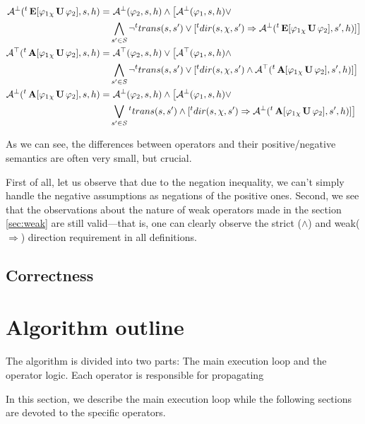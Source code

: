 \begin{align*}
	\mathcal{A}^\bot({}^{t}\operatorname{\mathbf{E}}[ \varphi_1 {}_{\chi}\operatorname{\mathbf{U}} \varphi_2], s, h) = &\ \mathcal{A}^\bot(\varphi_2, s, h) \land \big[ \mathcal{A}^\bot(\varphi_1, s, h) \lor \\
	& \bigwedge_{s' \in \mathit{S}} \neg{}^{t}trans(s,s') \lor [{}^{t}dir(s, \chi, s') \Rightarrow \mathcal{A}^\bot({}^{t}\operatorname{\mathbf{E}}[ \varphi_1 {}_{\chi}\operatorname{\mathbf{U}} \varphi_2], s', h)] \big] \\
	\mathcal{A}^\top({}^{t}\operatorname{\mathbf{A}}[ \varphi_1 {}_{\chi}\operatorname{\mathbf{U}} \varphi_2], s, h) = &\ \mathcal{A}^\top(\varphi_2, s, h) \lor \big[ \mathcal{A}^\top(\varphi_1, s, h) \land \\
	& \bigwedge_{s' \in \mathit{S}} \neg{}^{t}trans(s,s') \lor [{}^{t}dir(s, \chi, s') \land \mathcal{A}^\top({}^{t}\operatorname{\mathbf{A}}[ \varphi_1 {}_{\chi}\operatorname{\mathbf{U}} \varphi_2], s', h)] \big] \\
	\mathcal{A}^\bot({}^{t}\operatorname{\mathbf{A}}[ \varphi_1 {}_{\chi}\operatorname{\mathbf{U}} \varphi_2], s, h) = &\ \mathcal{A}^\bot(\varphi_2, s, h) \land \big[ \mathcal{A}^\bot(\varphi_1, s, h) \lor \\
	& \bigvee_{s' \in \mathit{S}} {}^{t}trans(s,s') \land [{}^{t}dir(s, \chi, s') \Rightarrow \mathcal{A}^\bot({}^{t}\operatorname{\mathbf{A}}[ \varphi_1 {}_{\chi}\operatorname{\mathbf{U}} \varphi_2], s', h)] \big] \\
\end{align*}

As we can see, the differences between operators and their positive/negative semantics are often very small, but crucial.

First of all, let us observe that due to the negation inequality, we can't simply handle the negative assumptions as negations of the positive ones. Second, we see that the observations about the nature of weak operators made in the section \ref{sec:weak} are still valid—that is, one can clearly observe the strict ($\land$) and weak($\Rightarrow$) direction requirement in all definitions.

\subsection{Correctness}

\section{Algorithm outline}

The algorithm is divided into two parts: The main execution loop and the operator logic. Each operator is responsible for propagating 

In this section, we describe the main execution loop while the following sections are devoted to the specific operators.

